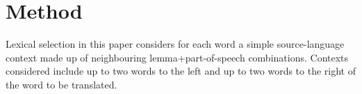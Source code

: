 \documentclass[11pt]{article}
\newcommand{\comment}[1]{\todo{#1}}
\begin{document}


\section{Method}


Lexical selection in this paper considers for
each word a simple source-language context made up of neighbouring
lemma+part-of-speech combinations. Contexts considered include up to
two words to the left and up to two words to the right of the word to
be translated. 
\end{document}

